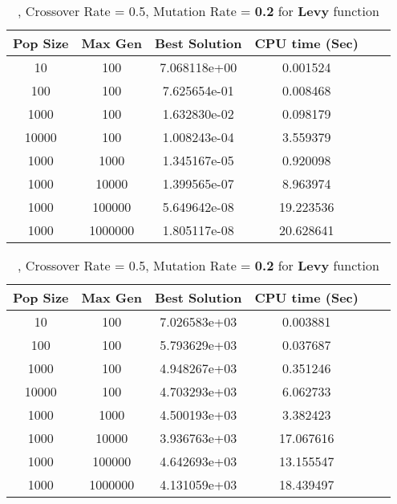 \documentclass[12pt]{article}
\begin{document}
	\begin{table}[H]
		\caption{, Crossover Rate = 0.5, Mutation Rate = \textbf{0.2} for \textbf{Levy} function}
		\label{table:2}
		\centering
		\begin{tabular}{c c c c c c}
			\hline
			Pop Size & Max Gen & Best Solution & CPU time (Sec) \\
			\hline
			10  & 100    & 
7.068118e+00 &
0.001524

  &  & &\\
			100 & 100    & 
7.625654e-01 &
0.008468

 &  & &\\
			1000& 100    & 
1.632830e-02 &
0.098179

 &   & &\\
			10000& 100    & 
1.008243e-04 &
3.559379

 &   & &\\
			\hline
			1000  & 1000   & 
1.345167e-05 &
0.920098

  & & &\\
			1000 & 10000  & 
1.399565e-07 &
8.963974

 &  & &\\
			1000& 100000 & 
5.649642e-08 &
19.223536

 &   & &\\
			1000& 1000000 & 
1.805117e-08 &
20.628641

 &   & &\\
			\hline
		\end{tabular}
	\end{table}

	\begin{table}[H]
		\caption{, Crossover Rate = 0.5, Mutation Rate = \textbf{0.2} for \textbf{Levy} function}
		\label{table:2}
		\centering
		\begin{tabular}{c c c c c c}
			\hline
			Pop Size & Max Gen & Best Solution & CPU time (Sec) \\
			\hline
			10  & 100    & 
7.026583e+03 &
0.003881

 &  & &\\
			100 & 100    & 
5.793629e+03 &
0.037687

 &  & &\\
			1000& 100    & 
4.948267e+03 &
0.351246

 &   & &\\
			10000& 100    & 
4.703293e+03 &
6.062733

 &   & &\\
			\hline
			1000  & 1000   & 
4.500193e+03 &
3.382423

  & & &\\
			1000 & 10000  & 
3.936763e+03 &
17.067616

 &  & &\\
			1000& 100000 & 
4.642693e+03 &
13.155547

 &   & &\\
			1000& 1000000 & 
4.131059e+03 &
18.439497

 &   & &\\
			\hline
		\end{tabular}
	\end{table}
\end{document}
